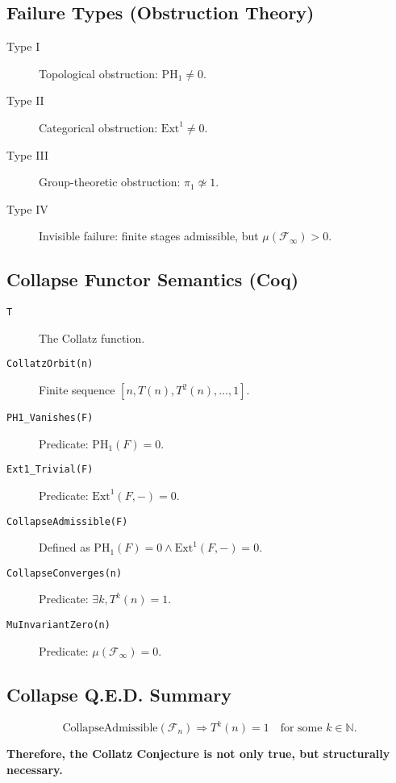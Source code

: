 \documentclass[11pt]{article}
\begin{document}
\subsection*{Failure Types (Obstruction Theory)}

\begin{description}
  \item[Type I] Topological obstruction: \( \mathrm{PH}_1 \neq 0 \).
  \item[Type II] Categorical obstruction: \( \mathrm{Ext}^1 \neq 0 \).
  \item[Type III] Group-theoretic obstruction: \( \pi_1 \not\simeq 1 \).
  \item[Type IV] Invisible failure: finite stages admissible, but \( \mu(\mathcal{F}_\infty) > 0 \).
\end{description}

\subsection*{Collapse Functor Semantics (Coq)}

\begin{description}
  \item[\texttt{T}] The Collatz function.
  \item[\texttt{CollatzOrbit(n)}] Finite sequence \( [n, T(n), T^2(n), \dots, 1] \).
  \item[\texttt{PH1\_Vanishes(F)}] Predicate: \( \mathrm{PH}_1(F) = 0 \).
  \item[\texttt{Ext1\_Trivial(F)}] Predicate: \( \mathrm{Ext}^1(F, -) = 0 \).
  \item[\texttt{CollapseAdmissible(F)}] Defined as \( \mathrm{PH}_1(F) = 0 \wedge \mathrm{Ext}^1(F, -) = 0 \).
  \item[\texttt{CollapseConverges(n)}] Predicate: \( \exists k, T^k(n) = 1 \).
  \item[\texttt{MuInvariantZero(n)}] Predicate: \( \mu(\mathcal{F}_\infty) = 0 \).
\end{description}

\subsection*{Collapse Q.E.D. Summary}

\[
\text{CollapseAdmissible}(\mathcal{F}_n) \Rightarrow T^k(n) = 1 \quad \text{for some } k \in \mathbb{N}.
\]

\begin{center}
\textbf{Therefore, the Collatz Conjecture is not only true, but structurally necessary.}
\end{center}
\end{document}
